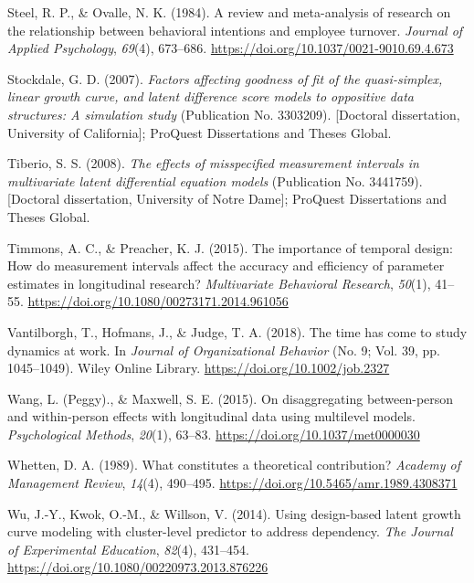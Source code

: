 \documentclass[
  english,
  man,floatsintext]{apa7}
\newlength{\cslhangindent}
\newlength{\cslentryspacingunit} %
\newenvironment{CSLReferences}[2] %
 {%
  \setlength{\parindent}{0pt}
  \ifodd #1
  \let\oldpar\par
  \def\par{\hangindent=\cslhangindent\oldpar}
  \fi
  \setlength{\parskip}{#2\cslentryspacingunit}
 }%
 {}
\begin{document}
\begin{CSLReferences}{1}{0}
\leavevmode{}%
Steel, R. P., \& Ovalle, N. K. (1984). A review and meta-analysis of research on the relationship between behavioral intentions and employee turnover. \emph{Journal of Applied Psychology}, \emph{69}(4), 673--686. \url{https://doi.org/10.1037/0021-9010.69.4.673}

\leavevmode{}%
Stockdale, G. D. (2007). \emph{Factors affecting goodness of fit of the quasi-simplex, linear growth curve, and latent difference score models to oppositive data structures: A simulation study} (Publication No. 3303209). {[}Doctoral dissertation, University of California{]}; {ProQuest Dissertations and Theses Global.}

\leavevmode{}%
Tiberio, S. S. (2008). \emph{The effects of misspecified measurement intervals in multivariate latent differential equation models} (Publication No. 3441759). {[}Doctoral dissertation, University of Notre Dame{]}; {ProQuest Dissertations and Theses Global.}

\leavevmode{}%
Timmons, A. C., \& Preacher, K. J. (2015). The importance of temporal design: How do measurement intervals affect the accuracy and efficiency of parameter estimates in longitudinal research? \emph{Multivariate Behavioral Research}, \emph{50}(1), 41--55. \url{https://doi.org/10.1080/00273171.2014.961056}

\leavevmode{}%
Vantilborgh, T., Hofmans, J., \& Judge, T. A. (2018). The time has come to study dynamics at work. In \emph{Journal of Organizational Behavior} (No. 9; Vol. 39, pp. 1045--1049). Wiley Online Library. \url{https://doi.org/10.1002/job.2327}

\leavevmode{}%
Wang, L. (Peggy)., \& Maxwell, S. E. (2015). On disaggregating between-person and within-person effects with longitudinal data using multilevel models. \emph{Psychological Methods}, \emph{20}(1), 63--83. \url{https://doi.org/10.1037/met0000030}

\leavevmode{}%
Whetten, D. A. (1989). What constitutes a theoretical contribution? \emph{Academy of Management Review}, \emph{14}(4), 490--495. \url{https://doi.org/10.5465/amr.1989.4308371}

\leavevmode{}%
Wu, J.-Y., Kwok, O.-M., \& Willson, V. (2014). Using design-based latent growth curve modeling with cluster-level predictor to address dependency. \emph{The Journal of Experimental Education}, \emph{82}(4), 431--454. \url{https://doi.org/10.1080/00220973.2013.876226}


\end{CSLReferences}
\end{document}
